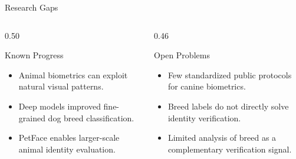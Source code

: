 \documentclass[aspectratio=169,11pt]{beamer}
\begin{document}
\begin{frame}{Research Gaps}
  \begin{columns}[T,onlytextwidth]
    \begin{column}{0.50\textwidth}
      \begin{block}{Known Progress}
        \begin{itemize}
          \item Animal biometrics can exploit natural visual patterns.
          \item Deep models improved fine-grained dog breed classification.
          \item PetFace enables larger-scale animal identity evaluation.
        \end{itemize}
      \end{block}
    \end{column}
    \begin{column}{0.46\textwidth}
      \begin{alertblock}{Open Problems}
        \begin{itemize}
          \item Few standardized public protocols for canine biometrics.
          \item Breed labels do not directly solve identity verification.
          \item Limited analysis of breed as a complementary verification signal.
        \end{itemize}
      \end{alertblock}
    \end{column}
  \end{columns}
\end{frame}
\end{document}
